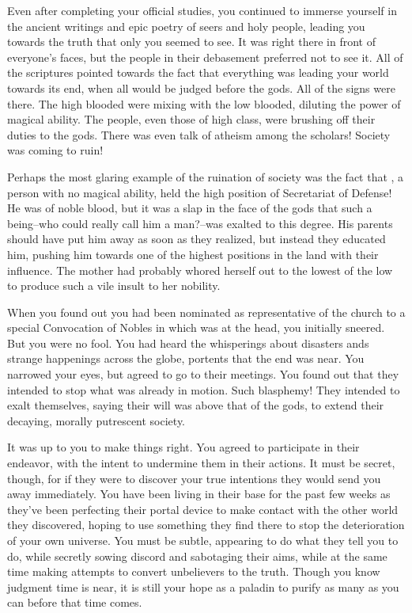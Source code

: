 \documentclass[char]{guildcamp3}
\begin{document}
Even after completing your official studies, you continued to immerse yourself in the ancient writings and epic poetry of seers and holy people, leading you towards the truth that only you seemed to see. It was right there in front of everyone's faces, but the people in their debasement preferred not to see it. All of the scriptures pointed towards the fact that everything was leading your world towards its end, when all would be judged before the gods. All of the signs were there. The high blooded were mixing with the low blooded, diluting the power of magical ability. The people, even those of high class, were brushing off their duties to the gods. There was even talk of atheism among the scholars! Society was coming to ruin!

Perhaps the most glaring example of the ruination of society was the fact that \cNobleOne{}, a person with no magical ability, held the high position of Secretariat of Defense! He was of noble blood, but it was a slap in the face of the gods that such a being--who could really call him a man?--was exalted to this degree. His parents should have put him away as soon as they realized, but instead they educated him, pushing him towards one of the highest positions in the land with their influence. The mother had probably whored herself out to the lowest of the low to produce such a vile insult to her nobility.

When you found out you had been nominated as representative of the church to a special Convocation of Nobles in which \cNobleOne{\they} was at the head, you initially sneered. But you were no fool. You had heard the whisperings about disasters ands strange happenings across the globe, portents that the end was near. You narrowed your eyes, but agreed to go to their meetings. You found out that they intended to stop what was already in motion. Such blasphemy! They intended to exalt themselves, saying their will was above that of the gods, to extend their decaying, morally putrescent society.

It was up to you to make things right. You agreed to participate in their endeavor, with the intent to undermine them in their actions. It must be secret, though, for if they were to discover your true intentions they would send you away immediately. You have been living in their base for the past few weeks as they've been perfecting their portal device to make contact with the other world they discovered, hoping to use something they find there to stop the deterioration of your own universe. You must be subtle, appearing to do what they tell you to do, while secretly sowing discord and sabotaging their aims, while at the same time making attempts to convert unbelievers to the truth. Though you know judgment time is near, it is still your hope as a paladin to purify as many as you can before that time comes.
\end{document}
